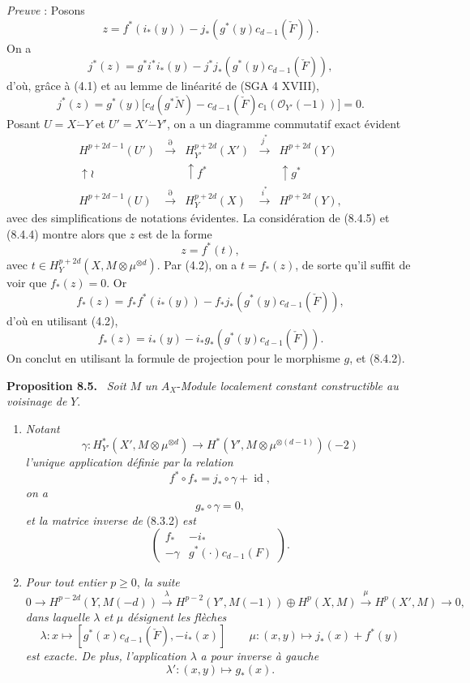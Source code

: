 \documentclass[11pt]{article}
\newenvironment{statement}[1]{\par\medskip\noindent\textbf{#1.}\ }{\par\medskip}
\begin{document}
\emph{Preuve} : Posons
\[
z=f^*(i_*(y))-j_*(g^*(y)c_{d-1}(\check F)).
\]
On a
\[
j^*(z)=g^*i^*i_*(y)-j^*j_*(g^*(y)c_{d-1}(\check F)),
\]
d'où, grâce à (4.1) et au lemme de linéarité de (SGA 4 XVIII),
\[
j^*(z)=g^*(y)\bigl[c_d(g^*\check N)-c_{d-1}(\check F)c_1(\mathcal O_{Y'}(-1))\bigr]=0.
\tag{8.4.4}
\]
Posant $U=X\mathbin{\dot{-}}Y$ et $U'=X'\mathbin{\dot{-}}Y'$, on a un diagramme commutatif exact évident
\[
\begin{array}{ccccc}
H^{p+2d-1}(U')&\xrightarrow{\partial}&H^{p+2d}_{Y'}(X')&\xrightarrow{j^*}&H^{p+2d}(Y)\\
\uparrow\wr&&\uparrow f^*&&\uparrow g^*\\
H^{p+2d-1}(U)&\xrightarrow{\partial}&H_Y^{p+2d}(X)&\xrightarrow{i^*}&H^{p+2d}(Y),
\end{array}
\tag{8.4.5}
\]
avec des simplifications de notations évidentes. La considération de (8.4.5) et (8.4.4) montre alors que $z$ est de la forme
\[
z=f^*(t),
\]
avec $t\in H_Y^{p+2d}(X,M\otimes\mu^{\otimes d})$. Par (4.2), on a $t=f_*(z)$, de sorte qu'il suffit de voir que $f_*(z)=0$. Or
\[
f_*(z)=f_*f^*(i_*(y))-f_*j_*(g^*(y)c_{d-1}(\check F)),
\]
d'où en utilisant (4.2),
\[
f_*(z)=i_*(y)-i_*g_*(g^*(y)c_{d-1}(\check F)).
\]
On conclut en utilisant la formule de projection pour le morphisme $g$, et (8.4.2).

\begin{statement}{Proposition 8.5}
\emph{Soit} $M$ \emph{un} $A_X$-\emph{Module localement constant constructible au voisinage de} $Y$.
\begin{enumerate}[label=\alph*)]
\item \emph{Notant}
\[
\gamma:H_{Y'}^*(X',M\otimes\mu^{\otimes d})\to
H^*(Y',M\otimes\mu^{\otimes(d-1)})(-2)
\]
\emph{l'unique application définie par la relation}
\[
f^*\circ f_* = j_*\circ\gamma+\operatorname{id},
\tag{8.5.1}
\]
\emph{on a}
\[
g_*\circ\gamma=0,
\tag{8.5.2}
\]
\emph{et la matrice inverse de} (8.3.2) \emph{est}
\[
\begin{pmatrix}
f_*&-i_*\\
-\gamma&g^*(\cdot)c_{d-1}(F)
\end{pmatrix}.
\tag{8.5.3}
\]
\item \emph{Pour tout entier} $p\ge0$, \emph{la suite}
\[
0\to H^{p-2d}(Y,M(-d))
\xrightarrow{\lambda}
H^{p-2}(Y',M(-1))\oplus H^p(X,M)
\xrightarrow{\mu}
H^p(X',M)\to0,
\]
\emph{dans laquelle} $\lambda$ \emph{et} $\mu$ \emph{désignent les flèches}
\[
\lambda : x\longmapsto [g^*(x)c_{d-1}(\check F),-i_*(x)]
\qquad
\mu : (x,y)\mapsto j_*(x)+f^*(y)
\]
\emph{est exacte. De plus, l'application} $\lambda$ \emph{a pour inverse à gauche}
\[
\lambda' : (x,y)\longmapsto g_*(x).
\]
\end{enumerate}
\end{statement}
\end{document}
